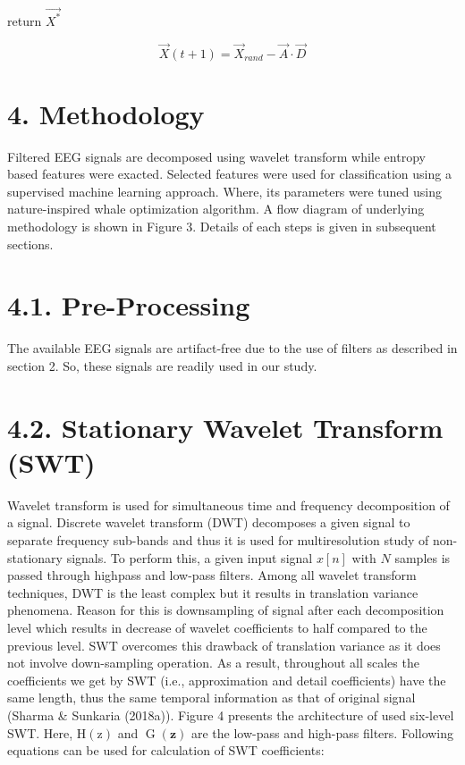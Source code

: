 \documentclass{article}
\begin{document}
return $\vec{X^{*}}$


$$ \vec{X}(t+1)=\vec{X}_{r a n d}-\vec{A}\cdot\vec{D} $$


\section{4. Methodology}

Filtered EEG signals are decomposed using wavelet transform while entropy based features were exacted. Selected features were used for classification using a supervised machine learning approach. Where, its parameters were tuned using nature-inspired whale optimization algorithm. A flow diagram of underlying methodology is shown in Figure 3. Details of each steps is given in subsequent sections.


\section{4.1. Pre-Processing}

The available EEG signals are artifact-free due to the use of filters as described in section 2. So, these signals are readily used in our study.


\section{4.2. Stationary Wavelet Transform (SWT)}

Wavelet transform is used for simultaneous time and frequency decomposition of a signal. Discrete wavelet transform (DWT) decomposes a given signal to separate frequency sub-bands and thus it is used for multiresolution study of non-stationary signals. To perform this, a given input signal $x[n]$ with $N$ samples is passed through highpass and low-pass filters. Among all wavelet transform techniques, DWT is the least complex but it results in translation variance phenomena. Reason for this is downsampling of signal after each decomposition level which results in decrease of wavelet coefficients to half compared to the previous level. SWT overcomes this drawback of translation variance as it does not involve down-sampling operation. As a result, throughout all scales the coefficients we get by SWT (i.e., approximation and detail coefficients) have the same length, thus the same temporal information as that of original signal (Sharma & Sunkaria (2018a)). Figure 4 presents the architecture of used six-level SWT. Here, $\mathrm{H}(\mathrm{z})$ and $\operatorname{G}(\mathbf{z})$ are the low-pass and high-pass filters. Following equations can be used for calculation of SWT coefficients:
\end{document}

